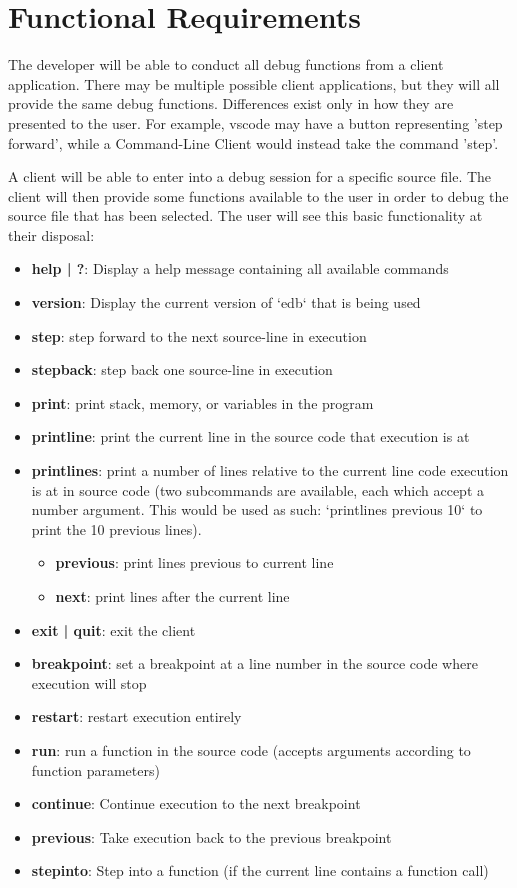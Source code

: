 \documentclass{report}
\begin{document}
\section{Functional Requirements}
The developer will be able to conduct all debug functions from a client application. There may be multiple possible client applications, but they will all provide the same debug functions. Differences exist only in how they are presented to the user. For example, \gls{vscode} may have a button representing 'step forward', while a Command-Line Client would instead take the command 'step'.

A client will be able to enter into a debug session for a specific source file. The client will then provide some functions available to the user in order to debug the source file that has been selected. The user will see this basic functionality at their disposal:
\begin{itemize}
	\item \textbf{help | ?}: Display a help message containing all available commands
	\item \textbf{version}: Display the current version of `edb` that is being used
	\item \textbf{step}: step forward to the next source-line in execution
	\item \textbf{stepback}: step back one source-line in execution
	\item \textbf{print}: print stack, memory, or variables in the program
	\item \textbf{printline}: print the current line in the source code that execution is at
	\item \textbf{printlines}: print a number of lines relative to the current line code execution is at in source code (two subcommands are available, each which accept a number argument. This would be used as such: `printlines previous 10` to print the 10 previous lines).
	\begin{itemize}
		\item \textbf{previous}: print lines previous to current line
		\item \textbf{next}: print lines after the current line
	\end{itemize}
	\item \textbf{exit | quit}: exit the client
	\item \textbf{breakpoint}: set a breakpoint at a line number in the source code where execution will stop
	\item \textbf{restart}: restart execution entirely
	\item \textbf{run}: run a function in the source code (accepts arguments according to function parameters)
	\item \textbf{continue}: Continue execution to the next breakpoint
	\item \textbf{previous}: Take execution back to the previous breakpoint
	\item \textbf{stepinto}: Step into a function (if the current line contains a function call)
\end{itemize}
\end{document}
